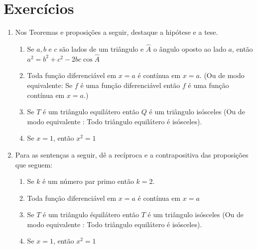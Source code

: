 \section{Exercícios}

\begin{enumerate}
    \item Nos Teoremas e proposições a seguir, destaque a hipótese e a tese.

      \begin{enumerate}

        \item Se $a,b$ e $c$ são lados de um triângulo e $\hat{A}$ o ângulo
          oposto ao lado $a$, então $a^2 = b^2 + c^2 - 2bc \cos \hat{A}$

        \item Toda função diferenciável em $x=a$ é contínua em $x=a$. (Ou de
          modo equivalente: Se $f$ é uma função diferenciável então $f$ é uma
          função contínua em $x=a$.)

        \item Se $T$ é um triângulo equilátero então $Q$ é um triângulo
          isósceles (Ou de modo equivalente : Todo triângulo equilátero é
          isósceles).

        \item Se $x=1$, então $x^2=1$

      \end{enumerate}

    \item Para as sentenças a seguir, dê a recíproca e a contrapositiva das
      proposições que seguem:

      \begin{enumerate}

        \item Se $k$ é um número par primo então $k=2$.

        \item Toda função diferenciável em $x=a$ é contínua em $x=a$

        \item Se $T$ é um triângulo équilátero então $T$ é um triângulo
          isósceles (Ou de modo equivalente : Todo triângulo equilátero é
          isósceles).

        \item Se $x=1$, então $x^2=1$

      \end{enumerate}


\end{enumerate}
